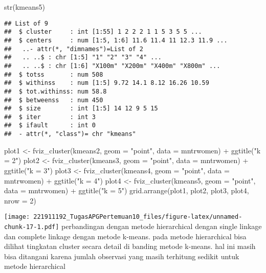 \documentclass[
]{article}
\newenvironment{Shaded}{\begin{snugshade}}{\end{snugshade}}
\newcommand{\AttributeTok}[1]{\textcolor[rgb]{0.77,0.63,0.00}{#1}}
\newcommand{\DecValTok}[1]{\textcolor[rgb]{0.00,0.00,0.81}{#1}}
\newcommand{\FunctionTok}[1]{\textcolor[rgb]{0.00,0.00,0.00}{#1}}
\newcommand{\NormalTok}[1]{#1}
\newcommand{\OtherTok}[1]{\textcolor[rgb]{0.56,0.35,0.01}{#1}}
\newcommand{\SpecialCharTok}[1]{\textcolor[rgb]{0.00,0.00,0.00}{#1}}
\newcommand{\StringTok}[1]{\textcolor[rgb]{0.31,0.60,0.02}{#1}}
\begin{document}
\begin{Shaded}
\begin{Highlighting}[]
\FunctionTok{str}\NormalTok{(kmeans5)}
\end{Highlighting}
\end{Shaded}

\begin{verbatim}
## List of 9
##  $ cluster     : int [1:55] 1 2 2 2 1 1 5 3 5 5 ...
##  $ centers     : num [1:5, 1:6] 11.6 11.4 11 12.3 11.9 ...
##   ..- attr(*, "dimnames")=List of 2
##   .. ..$ : chr [1:5] "1" "2" "3" "4" ...
##   .. ..$ : chr [1:6] "X100m" "X200m" "X400m" "X800m" ...
##  $ totss       : num 508
##  $ withinss    : num [1:5] 9.72 14.1 8.12 16.26 10.59
##  $ tot.withinss: num 58.8
##  $ betweenss   : num 450
##  $ size        : int [1:5] 14 12 9 5 15
##  $ iter        : int 3
##  $ ifault      : int 0
##  - attr(*, "class")= chr "kmeans"
\end{verbatim}

\begin{Shaded}
\begin{Highlighting}[]
\NormalTok{plot1 }\OtherTok{\textless{}{-}} \FunctionTok{fviz\_cluster}\NormalTok{(kmeans2, }\AttributeTok{geom =} \StringTok{"point"}\NormalTok{, }\AttributeTok{data =}\NormalTok{ mntrwomen) }\SpecialCharTok{+} 
\FunctionTok{ggtitle}\NormalTok{(}\StringTok{"k = 2"}\NormalTok{)}
\NormalTok{plot2 }\OtherTok{\textless{}{-}} \FunctionTok{fviz\_cluster}\NormalTok{(kmeans3, }\AttributeTok{geom =} \StringTok{"point"}\NormalTok{, }\AttributeTok{data =}\NormalTok{ mntrwomen) }\SpecialCharTok{+} 
\FunctionTok{ggtitle}\NormalTok{(}\StringTok{"k = 3"}\NormalTok{)}
\NormalTok{plot3 }\OtherTok{\textless{}{-}} \FunctionTok{fviz\_cluster}\NormalTok{(kmeans4, }\AttributeTok{geom =} \StringTok{"point"}\NormalTok{, }\AttributeTok{data =}\NormalTok{ mntrwomen) }\SpecialCharTok{+} 
\FunctionTok{ggtitle}\NormalTok{(}\StringTok{"k = 4"}\NormalTok{)}
\NormalTok{plot4 }\OtherTok{\textless{}{-}} \FunctionTok{fviz\_cluster}\NormalTok{(kmeans5, }\AttributeTok{geom =} \StringTok{"point"}\NormalTok{, }\AttributeTok{data =}\NormalTok{ mntrwomen) }\SpecialCharTok{+} 
\FunctionTok{ggtitle}\NormalTok{(}\StringTok{"k = 5"}\NormalTok{)}
\FunctionTok{grid.arrange}\NormalTok{(plot1, plot2, plot3, plot4, }\AttributeTok{nrow =} \DecValTok{2}\NormalTok{)}
\end{Highlighting}
\end{Shaded}

\texttt{[image: 221911192\_TugasAPGPertemuan10\_files/figure-latex/unnamed-chunk-17-1.pdf]}
perbandingan dengan metode hierarchical dengan single linkage dan
complete linkage dengan metode k-means. pada metode hierarchical bisa
dilihat tingkatan cluster secara detail di banding metode k-means. hal
ini masih bisa ditangani karena jumlah observasi yang masih terhitung
sedikit untuk metode hierarchical
\end{document}
